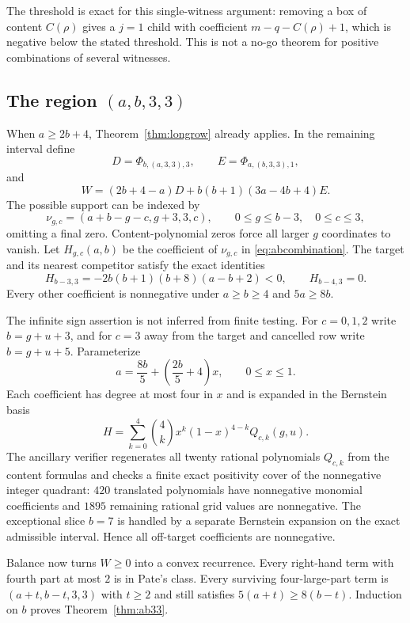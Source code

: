 \documentclass[11pt]{article}
\theoremstyle{definition}
\begin{document}
The threshold is exact for this single-witness argument: removing a box of content $C(\rho)$ gives a $j=1$ child with coefficient $m-q-C(\rho)+1$, which is negative below the stated threshold.  This is not a no-go theorem for positive combinations of several witnesses.

\subsection{\texorpdfstring{The region $(a,b,3,3)$}{The region (a,b,3,3)}}
When $a\ge2b+4$, Theorem~\ref{thm:longrow} already applies.  In the remaining interval define
\[
 D=\Phi_{b,(a,3,3),3},\qquad
 E=\Phi_{a,(b,3,3),1},
\]
and
\begin{equation}\label{eq:abcombination}
 W=(2b+4-a)D+b(b+1)(3a-4b+4)E.
\end{equation}
The possible support can be indexed by
\[
 \nu_{g,c}=(a+b-g-c,g+3,3,c),
 \qquad0\le g\le b-3,\quad0\le c\le3,
\]
omitting a final zero.  Content-polynomial zeros force all larger $g$ coordinates to vanish.  Let $H_{g,c}(a,b)$ be the coefficient of $\nu_{g,c}$ in \eqref{eq:abcombination}.  The target and its nearest competitor satisfy the exact identities
\[
 H_{b-3,3}=-2b(b+1)(b+8)(a-b+2)<0,
 \qquad H_{b-4,3}=0.
\]
Every other coefficient is nonnegative under $a\ge b\ge4$ and $5a\ge8b$.

The infinite sign assertion is not inferred from finite testing.  For $c=0,1,2$ write $b=g+u+3$, and for $c=3$ away from the target and cancelled row write $b=g+u+5$.  Parameterize
\[
 a=\frac{8b}{5}+\left(\frac{2b}{5}+4\right)x,
 \qquad0\le x\le1.
\]
Each coefficient has degree at most four in $x$ and is expanded in the Bernstein basis
\[
 H=\sum_{k=0}^4\binom4k x^k(1-x)^{4-k}Q_{c,k}(g,u).
\]
The ancillary verifier regenerates all twenty rational polynomials $Q_{c,k}$ from the content formulas and checks a finite exact positivity cover of the nonnegative integer quadrant: $420$ translated polynomials have nonnegative monomial coefficients and $1895$ remaining rational grid values are nonnegative.  The exceptional slice $b=7$ is handled by a separate Bernstein expansion on the exact admissible interval.  Hence all off-target coefficients are nonnegative.

Balance now turns $W\ge0$ into a convex recurrence.  Every right-hand term with fourth part at most $2$ is in Pate's class.  Every surviving four-large-part term is $(a+t,b-t,3,3)$ with $t\ge2$ and still satisfies $5(a+t)\ge8(b-t)$.  Induction on $b$ proves Theorem~\ref{thm:ab33}.
\end{document}
